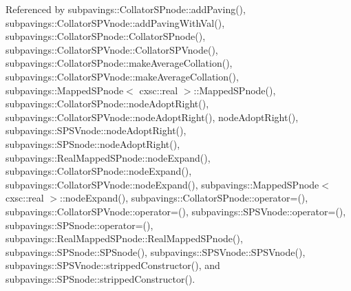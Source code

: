 \-Referenced by subpavings\-::\-Collator\-S\-Pnode\-::add\-Paving(), subpavings\-::\-Collator\-S\-P\-Vnode\-::add\-Paving\-With\-Val(), subpavings\-::\-Collator\-S\-Pnode\-::\-Collator\-S\-Pnode(), subpavings\-::\-Collator\-S\-P\-Vnode\-::\-Collator\-S\-P\-Vnode(), subpavings\-::\-Collator\-S\-Pnode\-::make\-Average\-Collation(), subpavings\-::\-Collator\-S\-P\-Vnode\-::make\-Average\-Collation(), subpavings\-::\-Mapped\-S\-Pnode$<$ cxsc\-::real $>$\-::\-Mapped\-S\-Pnode(), subpavings\-::\-Collator\-S\-Pnode\-::node\-Adopt\-Right(), subpavings\-::\-Collator\-S\-P\-Vnode\-::node\-Adopt\-Right(), node\-Adopt\-Right(), subpavings\-::\-S\-P\-S\-Vnode\-::node\-Adopt\-Right(), subpavings\-::\-S\-P\-Snode\-::node\-Adopt\-Right(), subpavings\-::\-Real\-Mapped\-S\-Pnode\-::node\-Expand(), subpavings\-::\-Collator\-S\-Pnode\-::node\-Expand(), subpavings\-::\-Collator\-S\-P\-Vnode\-::node\-Expand(), subpavings\-::\-Mapped\-S\-Pnode$<$ cxsc\-::real $>$\-::node\-Expand(), subpavings\-::\-Collator\-S\-Pnode\-::operator=(), subpavings\-::\-Collator\-S\-P\-Vnode\-::operator=(), subpavings\-::\-S\-P\-S\-Vnode\-::operator=(), subpavings\-::\-S\-P\-Snode\-::operator=(), subpavings\-::\-Real\-Mapped\-S\-Pnode\-::\-Real\-Mapped\-S\-Pnode(), subpavings\-::\-S\-P\-Snode\-::\-S\-P\-Snode(), subpavings\-::\-S\-P\-S\-Vnode\-::\-S\-P\-S\-Vnode(), subpavings\-::\-S\-P\-S\-Vnode\-::stripped\-Constructor(), and subpavings\-::\-S\-P\-Snode\-::stripped\-Constructor().



